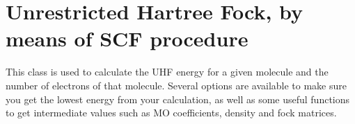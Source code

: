 \documentclass[letterpaper,10pt,english]{sphinxmanual}
\begin{document}
\label{\detokenize{UHF:module-hf.HartreeFock.UHF}}

\chapter{Unrestricted Hartree Fock, by means of SCF procedure}
\label{\detokenize{UHF:unrestricted-hartree-fock-by-means-of-scf-procedure}}\label{\detokenize{UHF::doc}}
This class is used to calculate the UHF energy for a given molecule and the number of electrons of that molecule.
Several options are available to make sure you get the lowest energy from your calculation, as well as some useful
functions to get intermediate values such as MO coefficients, density and fock matrices.
\end{document}
